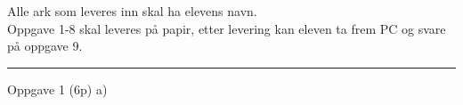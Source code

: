 \begin{itemize}[noitemsep]
\end{itemize}

Alle ark som leveres inn skal ha elevens navn. \\ 

Oppgave 1-8 skal leveres på papir, etter levering kan eleven ta frem PC og svare på oppgave 9.\\

\vskip 2.5pt 

\hrule
\vfil \eject
Oppgave 1 (6p)%
\vskip 2.5pt 
a) \\
\vskip 2.5pt 
\vskip 2.5pt 


